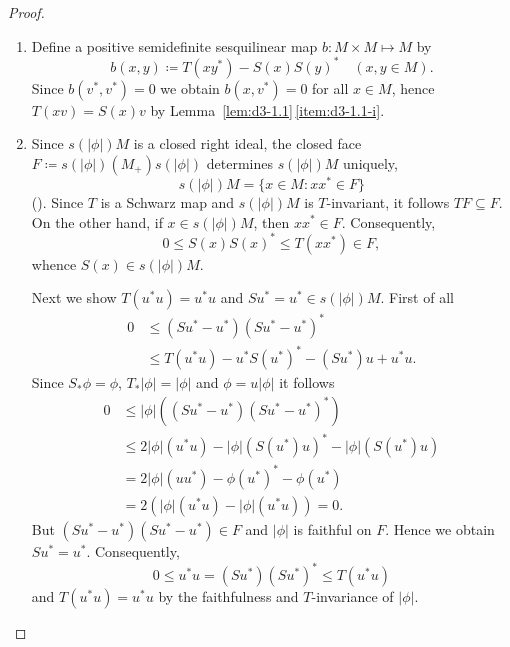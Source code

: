 \begin{proof}
\begin{enumerate}[\upshape (i), wide, labelindent=.25em]
\item 
Define a positive semidefinite sesquilinear map $b: M\times M \mapsto M$ by
\[
b(x,y) \coloneqq T(xy^{*}) - S(x)S(y)^{*} \quad (x, y\in M).
\]
Since $b(v^{*},v^{*}) = 0$ we obtain $b(x,v^{*}) = 0$ for all $x \in M$,  hence $T(xv) = S(x)v$ by Lemma~\ref{lem:d3-1.1}\,\ref{item:d3-1.1-i}.

\item
Since $s(|\phi|)M$ is a closed right ideal, the closed face $F \coloneqq s(|\phi|)(M_{+})s(|\phi|)$ determines $s(|\phi|)M$ uniquely, \ie
\[
s(|\phi|)M = \{x \in M \colon xx^{*} \in F\}
\]
(\textcite[Theorem 1.5.2]{pedersen:1979}). 
Since $T$ is a Schwarz map and $s(|\phi|)M$ is $T$-invariant, it follows $TF \subseteq F$.
On the other hand, if\/ $x \in s(|\phi|)M$, then $xx^{*} \in F$.
Consequently,
\[
0 \leq S(x)S(x)^{*} \leq T(xx^{*}) \in F,
\]
whence $S(x) \in s(|\phi|)M$.

Next we show $T(u^{*}u) = u^{*}u$ and $Su^{*} = u^{*} \in s(|\phi|)M$.
First of all
\begin{align*}
	0 &\leq (Su^{*} - u^{*})(Su^{*} - u^{*})^{*} \\
	& \leq T(u^{*}u) - u^{*}S(u^{*})^{*} - (Su^{*})u + u^{*}u.
\end{align*}
Since $ S_{*}\phi = \phi $, $ T_{*}|\phi| = |\phi| $ and $ \phi = u|\phi| $ it follows
\begin{align*}
	0 &\leq |\phi|((Su^{*} - u^{*})(Su^{*} - u^{*})^{*}) \\
	& \leq 2|\phi|(u^{*}u) - |\phi|(S(u^{*})u)^{*} - |\phi|(S(u^{*})u) \\
	& = 2|\phi|(uu^{*}) - \phi(u^{*})^{*} - \phi(u^{*}) \\
	& = 2(|\phi|(u^{*}u) - |\phi|(u^{*}u)) = 0.
\end{align*}
But $(Su^{*} - u^{*})(Su^{*} - u^{*}) \in F$ and $|\phi|$ is faithful on $F$.
Hence we obtain $Su^{*} = u^{*}$.
Consequently,
\[
	0 \leq u^{*}u = (Su^{*})(Su^{*})^{*} \leq T(u^{*}u)
\]
and $T(u^{*}u) = u^{*}u$ by the faithfulness and $T$-invariance of\/ $|\phi|$.
\end{enumerate}
\end{proof}
